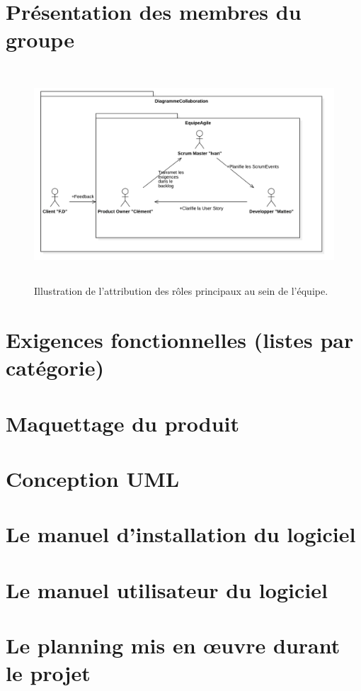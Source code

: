 \documentclass[12pt,a4paper]{scrartcl}
\theoremstyle{plain}
\theoremstyle{definition}
\theoremstyle{remark}
\begin{document}
	
	
	\tableofcontents
	
	
	
	
	\section{Présentation des membres du groupe}
	
	\begin{figure}[h]
		\centering
		\includegraphics[height=8cm]{img/diagCollaboration.png} 
		\caption{Illustration de l'attribution des rôles principaux au sein de l'équipe.}
	\end{figure}
	
	\section{Exigences fonctionnelles (listes par catégorie)}
	
	
	\section{Maquettage du produit}
	
	\section{Conception UML}
	
	
	\section{Le manuel d’installation du logiciel}
	 
	 \section{Le manuel utilisateur du logiciel}
	 
	 \section{Le planning mis en œuvre durant le projet}
	 
	 
	
	
\end{document}
